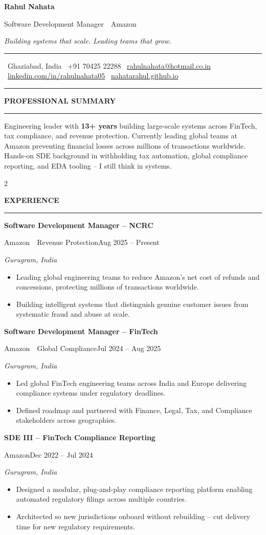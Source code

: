 \documentclass[9pt,a4paper]{extarticle}
\makeatletter
\newcommand{\cvsection}[1]{%
  \vspace{4pt}%
  {\small\bfseries\color{textdark}\MakeUppercase{#1}}\par
  \vspace{0pt}%
  {\color{accent}\rule{\linewidth}{0.8pt}}\par
  \vspace{2pt}%
}
\newcommand{\role}[4]{%
  {\bfseries\color{textdark}#1}\par
  {\color{accent}\footnotesize #2}\hfill{\color{textmuted}\footnotesize #4}\par
  {\color{textlight}\footnotesize\itshape #3}\par\vspace{1pt}
}
\newcommand{\resumeheader}{%
  \begingroup
  \setlength{\parskip}{0pt}
  \begin{flushleft}
    {\fontsize{22pt}{24pt}\selectfont\bfseries\color{textdark}Rahul Nahata}\par
    \vspace{1pt}
    {\normalsize\color{accent}Software Development Manager~\textperiodcentered~Amazon}\par
    \vspace{1pt}
    {\footnotesize\color{textmuted}\itshape Building systems that scale. Leading teams that grow.}\par
    \vspace{4pt}
    {\color{border}\rule{\linewidth}{0.6pt}}\par
    \vspace{2pt}
    {\footnotesize\color{textmuted}%
      \faMapMarker*~Ghaziabad, India \quad
      \faPhone*~+91 70425 22288 \quad
      \faEnvelope~\href{mailto:rahulnahata@hotmail.co.in}{rahulnahata@hotmail.co.in} \quad
      \faLinkedin~\href{https://linkedin.com/in/rahulnahata05}{linkedin.com/in/rahulnahata05} \quad
      \faGlobe~\href{https://nahatarahul.github.io}{nahatarahul.github.io}%
    }\par
    \vspace{1pt}
    {\color{border}\rule{\linewidth}{0.3pt}}
  \end{flushleft}
  \endgroup
}
\makeatother
\begin{document}
\pagestyle{empty}
\setlength{\parindent}{0pt}
\resumeheader

\cvsection{Professional Summary}
\footnotesize
Engineering leader with \textbf{13+ years} building large-scale systems across FinTech, tax
compliance, and revenue protection. Currently leading global teams at Amazon preventing
financial losses across millions of transactions worldwide. Hands-on SDE background in
withholding tax automation, global compliance reporting, and EDA tooling -- I still think
in systems.

\setlength{\columnsep}{1.0em}
\setlength{\columnseprule}{0pt}
\begin{paracol}{2}

\cvsection{Experience}
\role{Software Development Manager -- NCRC}{Amazon~\textperiodcentered~Revenue Protection}{Gurugram, India}{Aug 2025 -- Present}
\footnotesize
\begin{itemize}
  \item Leading global engineering teams to reduce Amazon's net cost of refunds and
        concessions, protecting millions of transactions worldwide.
  \item Building intelligent systems that distinguish genuine customer issues from
        systematic fraud and abuse at scale.
\end{itemize}

\role{Software Development Manager -- FinTech}{Amazon~\textperiodcentered~Global Compliance}{Gurugram, India}{Jul 2024 -- Aug 2025}
\footnotesize
\begin{itemize}
  \item Led global FinTech engineering teams across India and Europe delivering
        compliance systems under regulatory deadlines.
  \item Defined roadmap and partnered with Finance, Legal, Tax, and Compliance
        stakeholders across geographies.
\end{itemize}

\role{SDE III -- FinTech Compliance Reporting}{Amazon}{Gurugram, India}{Dec 2022 -- Jul 2024}
\footnotesize
\begin{itemize}
  \item Designed a modular, plug-and-play compliance reporting platform enabling
        automated regulatory filings across multiple countries.
  \item Architected so new jurisdictions onboard without rebuilding -- cut delivery
        time for new regulatory requirements.
\end{itemize}


\end{paracol}
\end{document}
